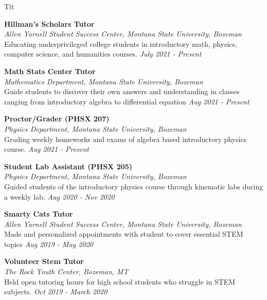 \documentclass[12pt]{article}
\begin{document}
\begin{multicols}{2}
Tit
\columnbreak

\noindent
\textbf{Hillman's Scholars Tutor}\\
\textit{Allen Yarnell Student Success Center, Montana State University, Bozeman}\\
Educating underprivileged college students in introductory math, physics, computer science, and humanities courses. \hfill
\textit{July 2021 - Present}

\noindent
\textbf{Math Stats Center Tutor}\\
\textit{Mathematics Department, Montana State University, Bozeman}\\
Guide students to discover their own answers and understanding in classes ranging from introductory algebra to differential equation \hfill
\textit{Aug 2021 - Present}

\noindent
\textbf{Proctor/Grader (PHSX 207)}\\
\textit{Physics Department, Montana State University, Bozeman}\\
Grading weekly homeworks and exams of algebra based introductory physics course. 	  \hfill
\textit{Aug 2021 - Present}

\noindent
\textbf{Student Lab Assistant (PHSX 205)}\\
\textit{Physics Department, Montana State University, Bozeman}\\
Guided students of the introductory physics course through kinematic labs during a weekly lab.	  \hfill
\textit{Aug 2020 - Nov 2020}

\noindent
\textbf{Smarty Cats Tutor}\\
\textit{Allen Yarnell Student Success Center, Montana State University, Bozeman}\\
Made and personalized appointments with student to cover essential STEM topics	  \hfill
\textit{Aug 2019 - May 2020}

\noindent
\textbf{Volunteer Stem Tutor}\\
\textit{The Rock Youth Center, Bozeman, MT}\\
Held open tutoring hours for high school students who struggle in STEM subjects.	  \hfill
\textit{Oct 2019 - March 2020}
\end{multicols}
\end{document}
